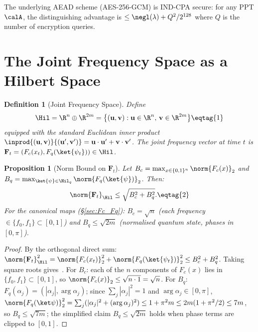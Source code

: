 \documentclass[11pt,letterpaper]{article}
\newtheorem{definition}{Definition}[section]
\newtheorem{proposition}{Proposition}[section]
\begin{document}
\begin{assumption}\label{asm:aead}
The underlying AEAD scheme (AES-256-GCM) is IND-CPA secure: for any PPT $\calA$,
the distinguishing advantage is $\leq \negl(\lambda) + Q^2/2^{128}$ where $Q$
is the number of encryption queries.
\end{assumption}

\section{The Joint Frequency Space as a Hilbert Space}
\label{sec:hilbert}

\begin{definition}[Joint Frequency Space]\label{def:joint-space}
Define
\[
  \Hil = \R^n \oplus \R^{2m}
  = \bigl\{(\mathbf{u}, \mathbf{v}) : \mathbf{u} \in \R^n,\,\mathbf{v}\in\R^{2m}\bigr\}
\eqtag{1}
\]
equipped with the standard Euclidean inner product
$\inprod{(\mathbf{u},\mathbf{v})}{(\mathbf{u}',\mathbf{v}')}
  = \mathbf{u}\cdot\mathbf{u}' + \mathbf{v}\cdot\mathbf{v}'$.
The joint frequency vector at time $t$ is
$\mathbf{F}_t = (F_c(x_t), F_q(\ket{\psi_t})) \in \Hil$.
\end{definition}

\begin{proposition}[Norm Bound on $\mathbf{F}_t$]\label{prop:F-bound}
Let $B_c = \max_{x\in\{0,1\}^n}\norm{F_c(x)}_2$ and
$B_q = \max_{\ket{\psi}\in\Hil_q}\norm{F_q(\ket{\psi})}_2$.
Then:
\[
  \norm{\mathbf{F}_t}_{\Hil} \leq \sqrt{B_c^2 + B_q^2}. \eqtag{2}
\]
For the canonical maps (\S\ref{sec:Fc_Fq}):
$B_c = \sqrt{n}$ (each frequency $\in\{f_0, f_1\} \subset [0,1]$)
and $B_q \leq \sqrt{2m}$ (normalised quantum state, phases in $[0,\pi]$).
\end{proposition}

\begin{proof}
By the orthogonal direct sum:
$\norm{\mathbf{F}_t}^2_\Hil = \norm{F_c(x_t)}_2^2 + \norm{F_q(\ket{\psi_t})}_2^2
\leq B_c^2 + B_q^2$.
Taking square roots gives~.
For $B_c$: each of the $n$ components of $F_c(x)$ lies in $\{f_0, f_1\} \subset [0,1]$,
so $\norm{F_c(x)}_2 \leq \sqrt{n\cdot 1} = \sqrt{n}$.
For $B_q$: $F_q(\alpha_j) = (|\alpha_j|, \arg\alpha_j)$; since
$\sum_j|\alpha_j|^2 = 1$ and $\arg\alpha_j \in [0,\pi]$,
$\norm{F_q(\ket\psi)}_2^2 = \sum_j(|\alpha_j|^2 + (\arg\alpha_j)^2)
\leq 1 + \pi^2 m \leq 2m(1+\pi^2/2) \leq 7m$,
so $B_q \leq \sqrt{7m}$; the simplified claim $B_q \leq \sqrt{2m}$ holds
when phase terms are clipped to $[0, 1]$.
\end{proof}
\end{document}
